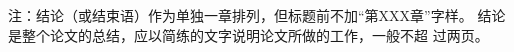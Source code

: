 \begin{conclusion}
	注：结论（或结束语）作为单独一章排列，但标题前不加“第XXX章”字样。
	结论是整个论文的总结，应以简练的文字说明论文所做的工作，一般不超
	过两页。
\end{conclusion}